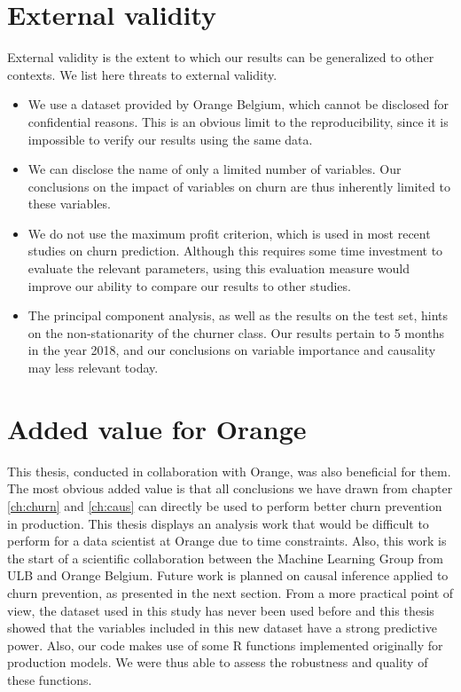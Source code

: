 \section{External validity}
\label{sec:ext_val}

External validity is the extent to which our results can be generalized to other
contexts. We list here threats to external validity.

\begin{itemize}
	\item We use a dataset provided by Orange Belgium, which cannot be disclosed
	for confidential reasons. This is an obvious limit to the reproducibility,
	since it is impossible to verify our results using the same data.

	\item We can disclose the name of only a limited number of variables. Our
	conclusions on the impact of variables on churn are thus inherently limited
	to these variables.

	\item We do not use the maximum profit criterion, which is used in most
	recent studies on churn prediction. Although this requires some time
	investment to evaluate the relevant parameters, using this evaluation
	measure would improve our ability to compare our results to other studies.

	\item The principal component analysis, as well as the results on the test
	set, hints on the non-stationarity of the churner class. Our results pertain
	to 5 months in the year 2018, and our conclusions on variable importance and
	causality may less relevant today.

\end{itemize}

\section{Added value for Orange}

This thesis, conducted in collaboration with Orange, was also beneficial for
them. The most obvious added value is that all conclusions we have drawn from chapter
\ref{ch:churn} and \ref{ch:caus} can directly be used to perform better churn
prevention in production. This thesis displays an analysis work that would be
difficult to perform for a data scientist at Orange due to time constraints.
Also, this work is the start of a scientific collaboration between the Machine
Learning Group from ULB and Orange Belgium. Future work is planned on causal
inference applied to churn prevention, as presented in the next section. From a
more practical point of view, the dataset used in this study has never been used
before and this thesis showed that the variables included in this new dataset
have a strong predictive power. Also, our code makes use of some R functions
implemented originally for production models. We were thus able to assess the
robustness and quality of these functions.

